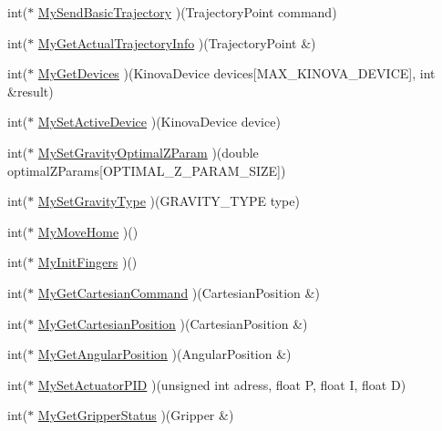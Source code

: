 \begin{DoxyCompactItemize}
\item 
int($\ast$ \hyperlink{classKinovaAPIFunctions_a7d3719b97975ce3e016fb5777f10d309}{My\+Send\+Basic\+Trajectory} )(Trajectory\+Point command)
\item 
int($\ast$ \hyperlink{classKinovaAPIFunctions_a3e97a6f0e744239e0ac581e782979cc0}{My\+Get\+Actual\+Trajectory\+Info} )(Trajectory\+Point \&)
\item 
int($\ast$ \hyperlink{classKinovaAPIFunctions_a9430806c9f3eee8318d7642e67771040}{My\+Get\+Devices} )(Kinova\+Device devices\mbox{[}M\+A\+X\+\_\+\+K\+I\+N\+O\+V\+A\+\_\+\+D\+E\+V\+I\+CE\mbox{]}, int \&result)
\item 
int($\ast$ \hyperlink{classKinovaAPIFunctions_a6da4f8a8cb0a630cf94a761f3c96a279}{My\+Set\+Active\+Device} )(Kinova\+Device device)
\item 
int($\ast$ \hyperlink{classKinovaAPIFunctions_ae1ae1eadcee874446b8bb417c84b0dcb}{My\+Set\+Gravity\+Optimal\+Z\+Param} )(double optimal\+Z\+Params\mbox{[}O\+P\+T\+I\+M\+A\+L\+\_\+\+Z\+\_\+\+P\+A\+R\+A\+M\+\_\+\+S\+I\+ZE\mbox{]})
\item 
int($\ast$ \hyperlink{classKinovaAPIFunctions_ae843b33c225f878073ad2c16bf71705e}{My\+Set\+Gravity\+Type} )(G\+R\+A\+V\+I\+T\+Y\+\_\+\+T\+Y\+PE type)
\item 
int($\ast$ \hyperlink{classKinovaAPIFunctions_a9a0b47551e606f15c4af278ea590f432}{My\+Move\+Home} )()
\item 
int($\ast$ \hyperlink{classKinovaAPIFunctions_a98b6741e75ab4b262a9bd630fdb9f562}{My\+Init\+Fingers} )()
\item 
int($\ast$ \hyperlink{classKinovaAPIFunctions_a1fc9b14b6b44eb77d659c10a69b5c5cf}{My\+Get\+Cartesian\+Command} )(Cartesian\+Position \&)
\item 
int($\ast$ \hyperlink{classKinovaAPIFunctions_ad63c60c0295983280170e0702f1d28b4}{My\+Get\+Cartesian\+Position} )(Cartesian\+Position \&)
\item 
int($\ast$ \hyperlink{classKinovaAPIFunctions_a13c78b6c5034339d03635268bd895b67}{My\+Get\+Angular\+Position} )(Angular\+Position \&)
\item 
int($\ast$ \hyperlink{classKinovaAPIFunctions_a82347afb2e50ad710b1cec3a86e77a40}{My\+Set\+Actuator\+P\+ID} )(unsigned int adress, float P, float I, float D)
\item 
int($\ast$ \hyperlink{classKinovaAPIFunctions_accc1c9c658d15e8601457b5fcd4af5b2}{My\+Get\+Gripper\+Status} )(Gripper \&)
\end{DoxyCompactItemize}


